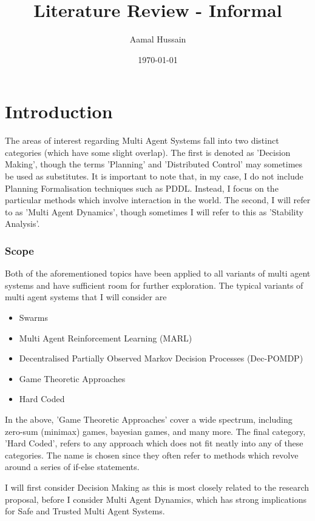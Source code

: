 \documentclass[preprint,11pt]{report}
\title{Literature Review - Informal}
\author{Aamal Hussain}
\date{\today}
\begin{document}
\maketitle 

\tableofcontents

\chapter*{Introduction}



The areas of interest regarding Multi Agent Systems fall into two distinct categories (which have
some slight overlap). The first is denoted as 'Decision Making', though the terms 'Planning' and
'Distributed Control' may sometimes be used as substitutes. It is important to note that, in my
case, I do not include Planning Formalisation techniques such as PDDL. Instead, I focus on the
particular methods which involve interaction in the world. The second, I will refer to as 'Multi
Agent Dynamics', though sometimes I will refer to this as 'Stability Analysis'. 

\subsection*{Scope}

Both of the aforementioned topics have been applied to all variants of multi agent systems and have
sufficient room for further exploration. The typical variants of multi agent systems that I will
consider are

\begin{itemize} \item Swarms \item Multi Agent Reinforcement Learning (MARL) \item Decentralised
Partially Observed Markov Decision Processes (Dec-POMDP) \item Game Theoretic Approaches \item Hard
Coded \end{itemize}

In the above, 'Game Theoretic Approaches' cover a wide spectrum, including zero-sum (minimax) games,
bayesian games, and many more. The final category, 'Hard Coded', refers to any approach which does
not fit neatly into any of these categories. The name is chosen since they often refer to methods
which revolve around a series of if-else statements.

I will first consider Decision Making as this is most closely related to the research proposal,
before I consider Multi Agent Dynamics, which has strong implications for Safe and Trusted Multi
Agent Systems. 
\end{document}
